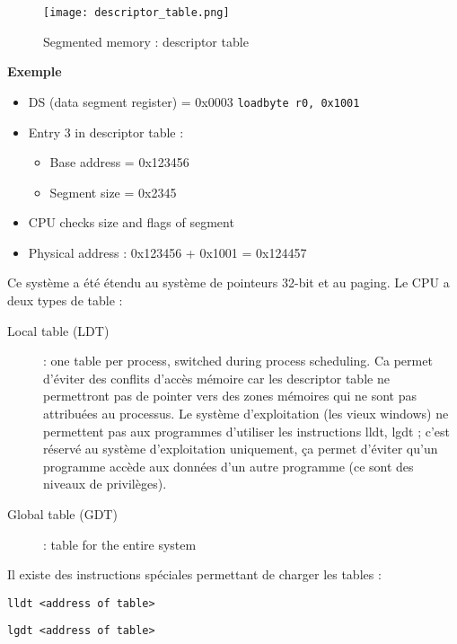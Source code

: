 \begin{figure}[!ht]
    \centering
    \texttt{[image: descriptor\_table.png]}
    \caption{Segmented memory : descriptor table}
\end{figure}

\begin{framed}
    \textbf{Exemple}

    \begin{itemize}
        \item DS (data segment register) = 0x0003
            \subitem \verb#loadbyte r0, 0x1001#
        \item Entry 3 in descriptor table :
            \begin{itemize}
                \item Base address = 0x123456
                \item Segment size = 0x2345
            \end{itemize}
        \item CPU checks size and flags of segment
        \item Physical address : 0x123456 + 0x1001 = 0x124457
    \end{itemize}
\end{framed}

Ce système a été étendu au système de pointeurs 32-bit et au paging. Le CPU a deux types de table : \newline

\bigskip
\begin{description}
    \item[Local table (LDT)] : one table per process, switched during
        process scheduling. Ca permet d'éviter des conflits d'accès
        mémoire car les descriptor table ne permettront pas de pointer
        vers des zones mémoires qui ne sont pas attribuées au processus.
        Le système d'exploitation (les vieux windows) ne permettent pas
        aux programmes d'utiliser les instructions lldt, lgdt ; c'est
        réservé au système d'exploitation uniquement, ça permet d'éviter
        qu'un programme accède aux données d'un autre programme (ce sont
        des niveaux de privilèges).
    \item[Global table (GDT)] : table for the entire system
\end{description}
\bigskip

Il existe des instructions spéciales permettant de charger les tables :

\begin{framed}
\verb#lldt <address of table>#

\verb#lgdt <address of table>#
\end{framed}

